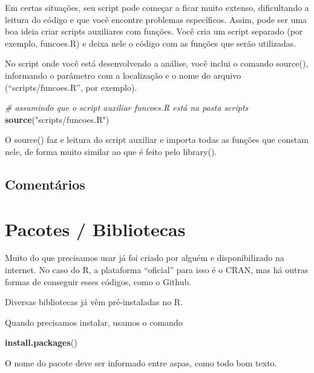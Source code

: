 \documentclass[
]{book}
\newenvironment{Shaded}{\begin{snugshade}}{\end{snugshade}}
\newcommand{\CommentTok}[1]{\textcolor[rgb]{0.56,0.35,0.01}{\textit{#1}}}
\newcommand{\KeywordTok}[1]{\textcolor[rgb]{0.13,0.29,0.53}{\textbf{#1}}}
\newcommand{\NormalTok}[1]{#1}
\newcommand{\StringTok}[1]{\textcolor[rgb]{0.31,0.60,0.02}{#1}}
\begin{document}
Em certas situações, seu script pode começar a ficar muito extenso, dificultando a leitura do código e que você encontre problemas específicos. Assim, pode ser uma boa ideia criar scripts auxiliares com funções. Você cria um script separado (por exemplo, funcoes.R) e deixa nele o código com as funções que serão utilizadas.

No script onde você está desenvolvendo a análise, você inclui o comando source(), informando o parâmetro com a localização e o nome do arquivo (``scripts/funcoes.R'', por exemplo).

\begin{Shaded}
\begin{Highlighting}[]
\CommentTok{# assumindo que o script auxiliar funcoes.R está na pasta scripts}
\KeywordTok{source}\NormalTok{(}\StringTok{"scripts/funcoes.R"}\NormalTok{)}
\end{Highlighting}
\end{Shaded}

O source() faz e leitura do script auxiliar e importa todas as funções que constam nele, de forma muito similar ao que é feito pelo library().

\hypertarget{comentuxe1rios}{%
\section{Comentários}\label{comentuxe1rios}}

\hypertarget{pacotes-bibliotecas}{%
\chapter{Pacotes / Bibliotecas}\label{pacotes-bibliotecas}}

Muito do que precisamos usar já foi criado por alguém e disponibilizado na internet. No caso do R, a plataforma ``oficial'' para isso é o CRAN, mas há outras formas de conseguir esses códigos, como o Github.

Diversas bibliotecas já vêm pré-instaladas no R.

Quando precisamos instalar, usamos o comando

\begin{Shaded}
\begin{Highlighting}[]
\KeywordTok{install.packages}\NormalTok{()}
\end{Highlighting}
\end{Shaded}

O nome do pacote deve ser informado entre aspas, como todo bom texto.
\end{document}
